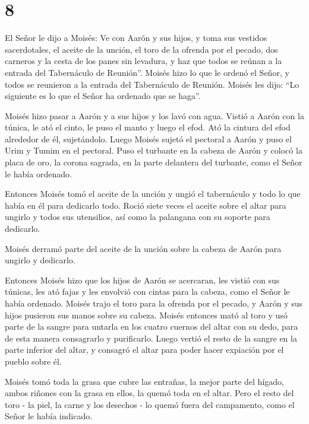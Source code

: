 \hypertarget{section-7}{%
\section{8}\label{section-7}}

 El Señor le dijo a Moisés:  Ve con Aarón y sus
hijos, y toma sus vestidos sacerdotales, el aceite de la unción, el toro
de la ofrenda por el pecado, dos carneros y la cesta de los panes sin
levadura,  y haz que todos se reúnan a la entrada del
Tabernáculo de Reunión''.  Moisés hizo lo que le ordenó el
Señor, y todos se reunieron a la entrada del Tabernáculo de Reunión.
 Moisés les dijo: ``Lo siguiente es lo que el Señor ha
ordenado que se haga''.

 Moisés hizo pasar a Aarón y a sus hijos y los lavó con
agua.  Vistió a Aarón con la túnica, le ató el cinto, le
puso el manto y luego el efod. Ató la cintura del efod alrededor de él,
sujetándolo.  Luego Moisés sujetó el pectoral a Aarón y puso
el Urim y Tumim en el pectoral.  Puso el turbante en la
cabeza de Aarón y colocó la placa de oro, la corona sagrada, en la parte
delantera del turbante, como el Señor le había ordenado.

 Entonces Moisés tomó el aceite de la unción y ungió el
tabernáculo y todo lo que había en él para dedicarlo todo. 
Roció siete veces el aceite sobre el altar para ungirlo y todos sus
utensilios, así como la palangana con su soporte para dedicarlo.

 Moisés derramó parte del aceite de la unción sobre la
cabeza de Aarón para ungirlo y dedicarlo.

 Entonces Moisés hizo que los hijos de Aarón se acercaran,
les vistió con sus túnicas, les ató fajas y les envolvió con cintas para
la cabeza, como el Señor le había ordenado.  Moisés trajo
el toro para la ofrenda por el pecado, y Aarón y sus hijos pusieron sus
manos sobre su cabeza.  Moisés entonces mató al toro y usó
parte de la sangre para untarla en los cuatro cuernos del altar con su
dedo, para de esta manera consagrarlo y purificarlo. Luego vertió el
resto de la sangre en la parte inferior del altar, y consagró el altar
para poder hacer expiación por el pueblo sobre él.

 Moisés tomó toda la grasa que cubre las entrañas, la mejor
parte del hígado, ambos riñones con la grasa en ellos, la quemó toda en
el altar.  Pero el resto del toro - la piel, la carne y los
desechos - lo quemó fuera del campamento, como el Señor le había
indicado.

